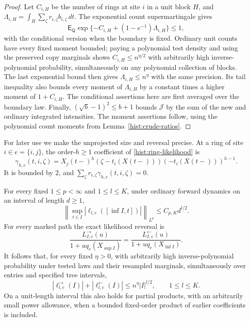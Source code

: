 \begin{proof}
Let $C_{i,H}$ be the number of rings at site $i$ in a unit block $H$, and
$\Lambda_{i,H}=\int_H\sum_\zeta r_{i,\zeta}b_{i,\zeta}\,dt$.  The
exponential count supermartingale \cite[Proposition~4.3]{Jacod1975} gives
\[
 \mathsf E_{\mathsf Q}\exp\{-C_{i,H}+(1-e^{-1})\Lambda_{i,H}\}\le1,
\]
with the conditional version when the boundary is fixed.  Ordinary unit
counts have every fixed moment bounded; paying a polynomial test density
and using the preserved copy marginals shows $C_{i,H}\le n^{\eta/2}$ with
arbitrarily high inverse-polynomial probability, simultaneously on any
polynomial collection of blocks.  The last exponential bound then gives
$\Lambda_{i,H}\le n^\eta$ with the same precision.  Its tail inequality
also bounds every moment of $\Lambda_{i,H}$ by a constant times a higher
moment of $1+C_{i,H}$.  The conditional assertions here are first averaged
over the boundary law.  Finally,
$(\sqrt b-1)^2\le b+1$ bounds $\mathcal J$ by the sum of the new and ordinary
integrated intensities.  The moment assertions follow, using the polynomial
count moments from Lemma~\ref{hist:crude-ratios}.
\end{proof}

For later use we make the unprojected size and reversal precise.  At a ring
of site $i\in e=\{i,j\}$, the order-$h\ge1$ coefficient of
\eqref{hist:ring-likelihood} is
\begin{equation}\label{score:ring-coefficient}
 \gamma_{h,e}(t,i,\zeta)
       =X_j(t-)^h(\zeta-t_i(X(t-)))(-t_i(X(t-)))^{h-1}.
\end{equation}
It is bounded by $2$, and
$\sum_\zeta r_{i,\zeta}\gamma_{h,e}(t,i,\zeta)=0$.

\begin{lemma}\label{score:raw-size}
For every fixed $1\le p<\infty$ and $1\le l\le K$, under ordinary forward
dynamics on an interval of length $d\ge1$,
\begin{equation}\label{score:martingale-moment}
 \left\|\sup_{t\in I}|\ell_{l,e}([\inf I,t])|\right\|_{L^p}
       \le C_{p,K}d^{l/2}.
\end{equation}
For every marked path the exact likelihood reversal is
\begin{equation}\label{score:reversal}
 \frac{L_{I,e}^{\to}(u)}{1+u q_e(X_{\sup I})}
   =\frac{L_{I,e}^{\leftarrow}(u)}{1+u q_e(X_{\inf I})}.
\end{equation}
It follows that, for every fixed $\eta>0$, with arbitrarily high
inverse-polynomial probability under tested laws and their resampled
marginals, simultaneously over entries and specified tree intervals,
\begin{equation}\label{score:raw-high-probability}
 |\ell_{l,e}^{\to}(I)|+|\ell_{l,e}^{\leftarrow}(I)|
       \le n^\eta |I|^{l/2},\qquad 1\le l\le K.
\end{equation}
On a unit-length interval this also holds for partial products, with an
arbitrarily small power allowance, when a bounded fixed-order product of
earlier coefficients is included.
\end{lemma}

